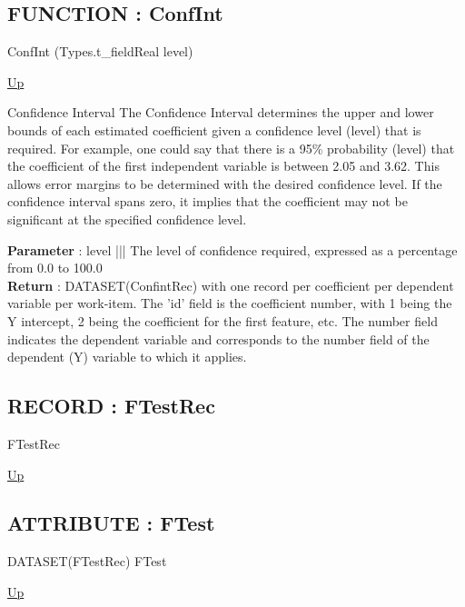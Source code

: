\par
\par
\subsection*{FUNCTION : ConfInt}
\hypertarget{ecldoc:linearregression.ols.confint}{}
\begin{minipage}[t]{\textwidth}
\begin{flushleft}
 ConfInt (Types.t\_fieldReal level)
\end{flushleft}
\end{minipage}
\hyperlink{ecldoc:linearregression.ols}{Up}

\par
Confidence Interval The Confidence Interval determines the upper and lower bounds of each estimated coefficient given a confidence level (level) that is required. For example, one could say that there is a 95\% probability (level) that the coefficient of the first independent variable is between 2.05 and 3.62. This allows error margins to be determined with the desired confidence level. If the confidence interval spans zero, it implies that the coefficient may not be significant at the specified confidence level.
\par
\textbf{Parameter} : level ||| The level of confidence required, expressed as a percentage from 0.0 to 100.0 \\
\textbf{Return} : DATASET(ConfintRec) with one record per coefficient per dependent variable per work-item. The 'id' field is the coefficient number, with 1 being the Y intercept, 2 being the coefficient for the first feature, etc. The number field indicates the dependent variable and corresponds to the number field of the dependent (Y) variable to which it applies. \\
\subsection*{RECORD : FTestRec}
\hypertarget{ecldoc:linearregression.ols.ftestrec}{}
\begin{minipage}[t]{\textwidth}
\begin{flushleft}
 FTestRec 
\end{flushleft}
\end{minipage}
\hyperlink{ecldoc:linearregression.ols}{Up}

\par
\par
\subsection*{ATTRIBUTE : FTest}
\hypertarget{ecldoc:linearregression.ols.ftest}{}
\begin{minipage}[t]{\textwidth}
\begin{flushleft}
DATASET(FTestRec) FTest 
\end{flushleft}
\end{minipage}
\hyperlink{ecldoc:linearregression.ols}{Up}

